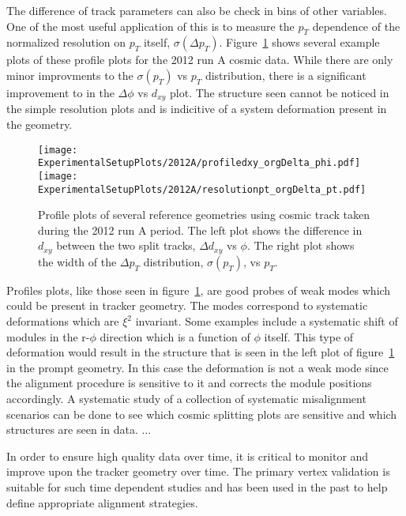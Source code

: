 The difference of track parameters can also be check in bins of other
variables.  One of the most useful application of this is to measure
the $p_T$ dependence of the normalized resolution on $p_T$ itself, 
$\sigma(\Delta p_T)$. Figure~\ref{fig:trackSplittingProfiles} shows 
several example plots of these profile plots for the 2012 run A cosmic 
data.  While there are only minor improvments to the $\sigma(p_T)$ vs
$p_T$ distribution, there is a significant improvement to in the $\Delta\phi$
vs $d_{xy}$ plot.  The structure seen cannot be noticed in the simple
resolution plots and is indicitive of a system deformation present in
the geometry.  

\begin{figure}
\begin{center}
\texttt{[image: ExperimentalSetupPlots/2012A/profiledxy\_orgDelta\_phi.pdf]}
\texttt{[image: ExperimentalSetupPlots/2012A/resolutionpt\_orgDelta\_pt.pdf]}
\label{fig:trackSplittingProfiles}
\caption{Profile plots of several reference geometries using cosmic track
taken during the 2012 run A period.  The left plot shows the difference 
in $d_{xy}$ between the two split tracks, $\Delta d_{xy}$ vs $\phi$.  The 
right plot shows the width of the $\Delta p_T$ distribution, $\sigma(p_T)$, 
vs $p_T$.}
\end{center}
\end{figure}

Profiles plots, like those seen in figure~\ref{fig:trackSplittingProfiles}, 
are good probes of weak modes which could be present in
tracker geometry.  The modes correspond to systematic deformations which 
are $\xi^2$ invariant.  Some examples include a systematic shift of modules
in the r-$\phi$ direction which is a function of $\phi$ itself.  This 
type of deformation would result in the structure that is seen in the 
left plot of figure~\ref{fig:trackSplittingProfiles} in the prompt geometry.
In this case the deformation is not a weak mode since the alignment 
procedure is sensitive to it and corrects the module positions accordingly.
A systematic study of a collection of systematic misalignment scenarios
can be done to see which cosmic splitting plots are sensitive and which 
structures are seen in data.  ... 



In order to ensure high quality data over time, it 
is critical to monitor and improve upon the tracker geometry over time.  
The primary vertex validation is suitable for such time dependent studies
and has been used in the past to help define appropriate alignment 
strategies. 

